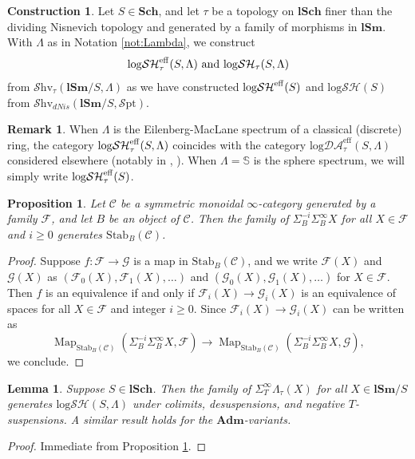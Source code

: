 \documentclass[11pt, a4paper]{amsart}
\newtheorem{prop}[thm]{Proposition}
\newtheorem{lem}[thm]{Lemma}
\theoremstyle{definition}
\newtheorem{const}[thm]{Construction}
\newtheorem{rmk}[thm]{Remark}
\numberwithin{equation}{subsection}
\newcommand{\Sch}{\mathbf{Sch}}
\newcommand{\lSch}{\mathbf{lSch}}
\newcommand{\lSm}{\mathbf{lSm}}
\newcommand{\Adm}{\mathbf{Adm}}
\newcommand{\Stab}{\mathrm{Stab}}
\newcommand{\cF}{\mathcal{F}}
\newcommand{\cG}{\mathcal{G}}
\newcommand{\sF}{\mathscr{F}}
\newcommand{\eff}{{\rm eff}}
\newcommand{\infShv}{\mathcal{S}\mathrm{hv}}
\newcommand{\infSpt}{\mathcal{S}\mathrm{pt}}
\newcommand{\Map}{\operatorname{Map}}
\newcommand{\infC}{\mathcal{C}}
\newcommand{\inflogSH}{\mathrm{log}\mathcal{SH}}
\newcommand{\inflogDAeff}{\mathrm{log}\mathcal{DA}^{\mathrm{eff}}}
\begin{document}
\begin{const}
Let $S\in \Sch$,
and let $\tau$ be a topology on $\lSch$ finer than the dividing Nisnevich topology and generated by a family of morphisms in $\lSm$.
With $\Lambda$ as in Notation \ref{not:Lambda},
we construct
\[
\inflogSH_\tau^\eff(S,\Lambda)
\text{ and }
\inflogSH_\tau(S,\Lambda)
\]
from $\infShv_\tau(\lSm/S,\Lambda)$ as we have constructed $\inflogSH^\eff(S)$ and $\inflogSH(S)$ from $\infShv_{dNis}(\lSm/S,\infSpt)$.
\end{const}

\begin{rmk}
When $\Lambda$ is the Eilenberg-MacLane spectrum of a classical (discrete) ring, the category $\inflogSH_{\tau}^\eff(S, \Lambda)$ coincides with the category $\inflogDAeff_\tau(S, \Lambda)$ considered elsewhere (notably in \cite{BLPO}, \cite{BLMP}). When $\Lambda=\mathbb{S}$ is the sphere spectrum, we will simply write $\inflogSH_{\tau}^\eff(S)$.
\end{rmk}



\begin{prop}
\label{alter.6}
Let $\infC$ be a symmetric monoidal $\infty$-category generated by a family $\sF$, and let $B$ be an object of $\infC$.
Then the family of $\Sigma_B^{-i} \Sigma_B^\infty X$ for all $X\in \sF$ and $i\geq 0$ generates $\Stab_B(\infC)$.
\end{prop}
\begin{proof}
Suppose $f\colon \cF\to \cG$ is a map in $\Stab_B(\infC)$, and we write $\cF(X)$ and $\cG(X)$ as $(\cF_0(X),\cF_1(X),\ldots)$ and $(\cG_0(X),\cG_1(X),\ldots)$ for $X\in \sF$.
Then $f$ is an equivalence if and only if $\cF_i(X)\to \cG_i(X)$ is an equivalence of spaces for all $X\in \sF$ and integer $i\geq 0$.
Since $\cF_i(X)\to \cG_i(X)$ can be written as
\[
\Map_{\Stab_B(\infC)}(\Sigma_B^{-i} \Sigma_B^\infty X,\cF)
\to
\Map_{\Stab_B(\infC)}(\Sigma_B^{-i} \Sigma_B^\infty X,\cG),
\]
we conclude.
\end{proof}
\begin{lem}
\label{alter.7}
Suppose $S\in \lSch$.
Then the family of $\Sigma_T^\infty \Lambda_\tau(X)$
 for all $X\in \lSm/S$ generates $\inflogSH(S, \Lambda)$ under colimits,  desuspensions, and negative $T$-suspensions.
A similar result holds for the $\Adm$-variants.
\end{lem}
\begin{proof}
Immediate from Proposition \ref{alter.6}.
\end{proof}
\end{document}
